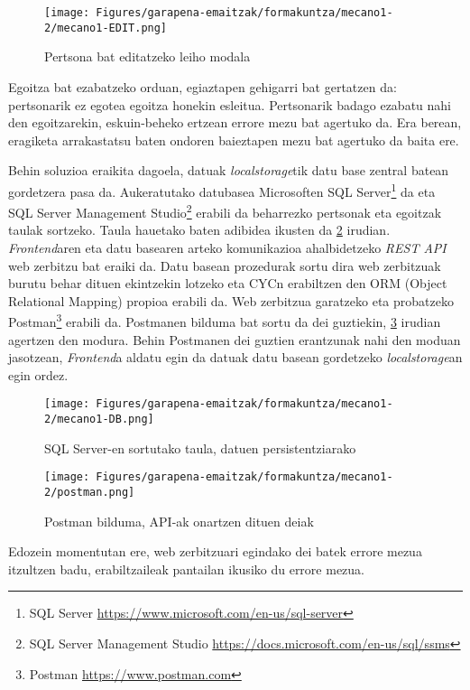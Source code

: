 \begin{figure}[H]
\centering
\texttt{[image: Figures/garapena-emaitzak/formakuntza/mecano1-2/mecano1-EDIT.png]}
\caption{Pertsona bat editatzeko leiho modala}
\label{mecano1-modal}
\end{figure}

Egoitza bat ezabatzeko orduan, egiaztapen gehigarri bat gertatzen da: pertsonarik ez egotea egoitza
honekin esleitua. Pertsonarik badago ezabatu nahi den egoitzarekin, eskuin-beheko ertzean errore mezu bat
agertuko da. Era berean, eragiketa arrakastatsu baten ondoren baieztapen mezu bat
agertuko da baita ere.

Behin soluzioa eraikita dagoela, datuak \textit{localstorage}tik datu base zentral batean gordetzera pasa da.
Aukeratutako datubasea Microsoften SQL Server\footnote{SQL Server \url{https://www.microsoft.com/en-us/sql-server}} da eta SQL Server Management Studio\footnote{SQL Server Management Studio \url{https://docs.microsoft.com/en-us/sql/ssms}} erabili da beharrezko
pertsonak eta egoitzak taulak sortzeko. Taula hauetako baten adibidea ikusten da \ref{img:sql-server} irudian. \textit{Frontend}aren eta datu basearen arteko komunikazioa ahalbidetzeko
\textit{REST API} web zerbitzu bat eraiki da. Datu basean prozedurak sortu dira web zerbitzuak burutu behar dituen
ekintzekin lotzeko eta CYCn erabiltzen den ORM (Object Relational Mapping) propioa erabili da. Web
zerbitzua garatzeko eta probatzeko Postman\footnote{Postman \url{https://www.postman.com}} erabili da. Postmanen bilduma bat sortu da dei guztiekin, \ref{img:postman} irudian agertzen den modura. Behin Postmanen dei guztien erantzunak nahi den
moduan jasotzean, \textit{Frontend}a aldatu egin da datuak datu basean gordetzeko \textit{localstorage}an egin ordez.

\begin{figure}[H]
\centering
\texttt{[image: Figures/garapena-emaitzak/formakuntza/mecano1-2/mecano1-DB.png]}
\caption{SQL Server-en sortutako taula, datuen persistentziarako}
\label{img:sql-server}
\end{figure}

\begin{figure}[H]
\centering
\texttt{[image: Figures/garapena-emaitzak/formakuntza/mecano1-2/postman.png]}
\caption{Postman bilduma, API-ak onartzen dituen deiak}
\label{img:postman}
\end{figure}

Edozein momentutan ere, web zerbitzuari egindako dei batek errore mezua itzultzen badu, erabiltzaileak
pantailan ikusiko du errore mezua. 

